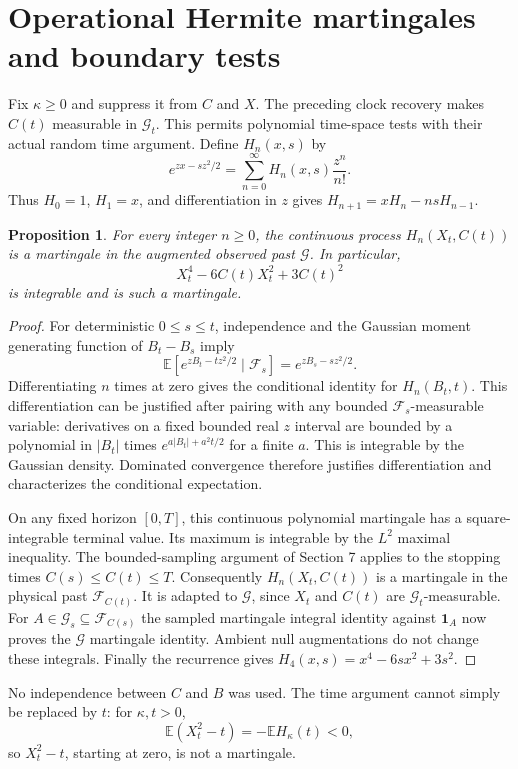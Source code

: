 \documentclass[11pt]{article}
\newtheorem{proposition}[theorem]{Proposition}
\newcommand{\E}{\mathbb E}
\newcommand{\ind}{\mathbf1}
\newcommand{\F}{\mathcal F}
\newcommand{\G}{\mathcal G}
\begin{document}
\section{Operational Hermite martingales and boundary tests}\label{sec:boundary}
Fix $\kappa\geq0$ and suppress it from $C$ and $X$. The preceding
clock recovery makes $C(t)$ measurable in $\G_t$. This permits
polynomial time-space tests with their actual random time argument.
Define $H_n(x,s)$ by
\[
 e^{zx-sz^2/2}=\sum_{n=0}^\infty H_n(x,s)\frac{z^n}{n!}.
\]
Thus $H_0=1$, $H_1=x$, and differentiation in $z$ gives
$H_{n+1}=xH_n-nsH_{n-1}$.

\begin{proposition}\label{prop:hermite}
For every integer $n\geq0$, the continuous process
$H_n(X_t,C(t))$ is a martingale in the augmented observed past $\G$.
In particular,
\[
 X_t^4-6C(t)X_t^2+3C(t)^2
\]
is integrable and is such a martingale.
\end{proposition}
\begin{proof}
For deterministic $0\leq s\leq t$, independence and the Gaussian
moment generating function of $B_t-B_s$ imply
\[
 \E[e^{zB_t-tz^2/2}\mid\F_s]=e^{zB_s-sz^2/2}.
\]
Differentiating $n$ times at zero gives the conditional identity
for $H_n(B_t,t)$. This differentiation can be justified after
pairing with any bounded $\F_s$-measurable variable: derivatives
on a fixed bounded real $z$ interval are bounded by a polynomial
in $|B_t|$ times $e^{a|B_t|+a^2t/2}$ for a finite $a$.
This is integrable by the Gaussian density. Dominated convergence
therefore justifies differentiation and characterizes the conditional
expectation.

On any fixed horizon $[0,T]$, this continuous polynomial martingale
has a square-integrable terminal value. Its maximum is integrable
by the $L^2$ maximal inequality. The bounded-sampling argument of
Section 7 applies to the stopping times $C(s)\leq C(t)\leq T$.
Consequently $H_n(X_t,C(t))$ is a martingale in the physical past
$\F_{C(t)}$. It is adapted to $\G$, since $X_t$ and $C(t)$ are
$\G_t$-measurable. For $A\in\G_s\subseteq\F_{C(s)}$ the sampled
martingale integral identity against $\ind_A$ now proves the
$\G$ martingale identity. Ambient null augmentations do not change
these integrals. Finally the recurrence gives
$H_4(x,s)=x^4-6sx^2+3s^2$.
\end{proof}
No independence between $C$ and $B$ was used. The time argument
cannot simply be replaced by $t$: for $\kappa,t>0$,
\[
 \E(X_t^2-t)=-\E H_\kappa(t)<0,
\]
so $X_t^2-t$, starting at zero, is not a martingale.
\end{document}
